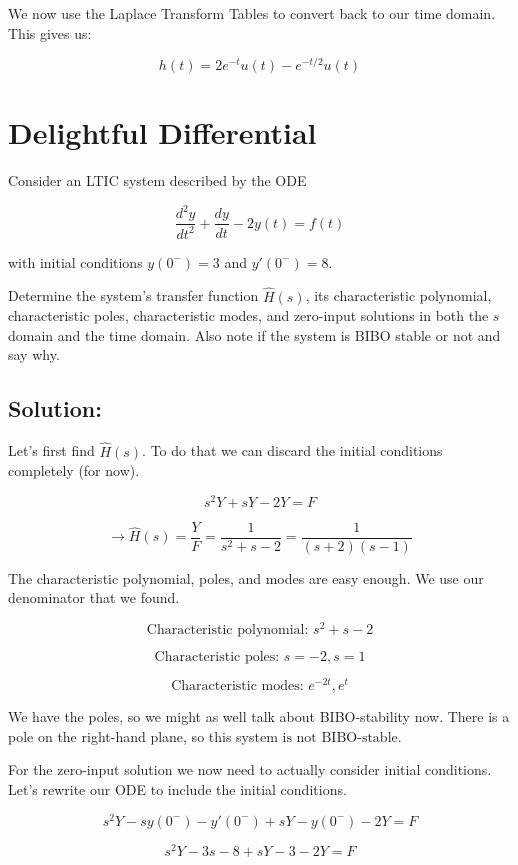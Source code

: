 \documentclass{article}
\begin{document}
We now use the Laplace Transform Tables to convert back to our time domain. This gives us:

\[
\boxed{h(t) = 2e^{-t}u(t)-e^{-t/2}u(t)}
\]

\newpage

\section{Delightful Differential}

Consider an LTIC system described by the ODE

$$\frac{d^2y}{dt^2}+\frac{dy}{dt}-2y(t) = f(t)$$

with initial conditions $y(0^-) = 3$ and $y'(0^-) = 8$.

Determine the system's transfer function $\hat{H}(s)$, its characteristic polynomial, characteristic poles, characteristic modes, and zero-input solutions in both the $s$ domain and the time domain. Also note if the system is BIBO stable or not and say why.

\subsection{Solution:}

Let's first find $\hat{H}(s)$. To do that we can discard the initial conditions completely (for now).

$$s^2Y + sY - 2Y = F$$

$$\longrightarrow \boxed{\hat{H}(s) = \frac{Y}{F} = \frac{1}{s^2 + s - 2} = \frac{1}{(s+2)(s-1)}}$$

The characteristic polynomial, poles, and modes are easy enough. We use our denominator that we found.

$$\boxed{\text{Characteristic polynomial: } s^2 + s - 2}$$

$$\boxed{\text{Characteristic poles: } s = -2, s = 1}$$

$$\boxed{\text{Characteristic modes: } e^{-2t}, e^t}$$

We have the poles, so we might as well talk about BIBO-stability now. There is a pole on the right-hand plane, so this system $\boxed{\text{is not BIBO-stable}}$.

For the zero-input solution we now need to actually consider initial conditions. Let's rewrite our ODE to include the initial conditions.

$$s^2Y - sy(0^-) - y'(0^-) + sY - y(0^-) - 2Y = F$$

$$s^2Y - 3s - 8 + sY - 3 - 2Y = F$$
\end{document}
